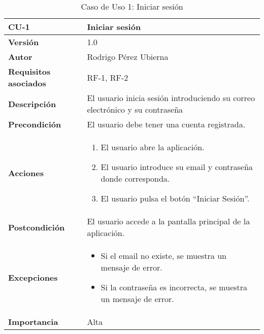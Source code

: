 
\begin{table}[p]
	\centering
	\begin{tabularx}{\linewidth}{ p{} p{} }
		\toprule
		\textbf{CU-1} & \textbf{Iniciar sesión}\\
		\toprule
		\textbf{Versión} & 1.0 \\
		\textbf{Autor} & Rodrigo Pérez Ubierna \\
		\textbf{Requisitos asociados} & RF-1, RF-2 \\
		\textbf{Descripción} & El usuario inicia sesión introduciendo su correo electrónico y su contraseña \\
		\textbf{Precondición} & El usuario debe tener una cuenta registrada. \\
		\textbf{Acciones} &
		\begin{enumerate}
			\def\labelenumi{\arabic{enumi}.}
			\tightlist
			\item El usuario abre la aplicación.
			\item El usuario introduce su email y contraseña donde corresponda.
			\item El usuario pulsa el botón ``Iniciar Sesión''.
		\end{enumerate}\\
		\textbf{Postcondición} & El usuario accede a la pantalla principal de la aplicación. \\
		\textbf{Excepciones} & 
			\begin{itemize}
				\item Si el email no existe, se muestra un mensaje de error.
				\item Si la contraseña es incorrecta, se muestra un mensaje de error.
			\end{itemize} \\
		\textbf{Importancia} & Alta \\
		\bottomrule
	\end{tabularx}
	\caption{Caso de Uso 1: Iniciar sesión}
\end{table}

